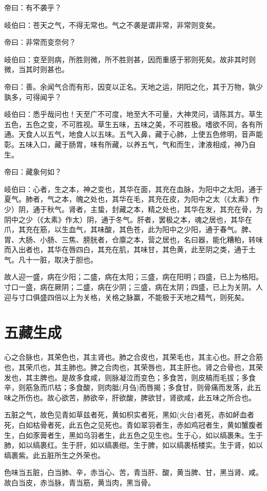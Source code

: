 \documentclass{article}%
\begin{document}
帝曰：有不袭乎？

岐伯曰：苍天之气，不得无常也。气之不袭是谓非常，非常则变矣。

帝曰：非常而变奈何？

岐伯曰：变至则病，所胜则微，所不胜则甚，因而重感于邪则死矣。故非其时则微，当其时则甚也。

帝曰：善。余闻气合而有形，因变以正名。天地之运，阴阳之化，其于万物，孰少孰多，可得闻乎？

岐伯曰：悉乎哉问也！天至广不可度，地至大不可量，大神灵问，请陈其方。草生五色，五色之变，不可胜视。草生五味，五味之美，不可胜极。嗜欲不同，各有所通。天食人以五气，地食人以五味。五气入鼻，藏于心肺，上使五色修明，音声能彰。五味入口，藏于肠胃，味有所藏，以养五气，气和而生，津液相成，神乃自生。

帝曰：藏象何如？

岐伯曰：心者，生之本，神之变也，其华在面，其充在血脉，为阳中之太阳，通于夏气。肺者，气之本，魄之处也，其华在毛，其充在皮，为阳中之太（《太素》作少）阴，通于秋气。肾者，主蛰，封藏之本，精之处也，其华在发，其充在骨，为阴中之少（《太素》作太）阴，通于冬气。肝者，罢极之本，魂之居也，其华在爪，其充在筋，以生血气，其味酸，其色苍，此为阳中之少阳，通于春气。脾、胃、大肠、小肠、三焦、膀胱者，仓廪之本，营之居也，名曰器，能化糟粕，转味而入出者也，其华在唇四白，其充在肌，其味甘，其色黄，此至阴之类，通于土气。凡十一脏，取决于胆也。

故人迎一盛，病在少阳；二盛，病在太阳；三盛，病在阳明；四盛，已上为格阳。寸口一盛，病在厥阴；二盛，病在少阴；三盛，病在太阴；四盛，已上为关阴。人迎与寸口俱盛四倍以上为关格，关格之脉赢，不能极于天地之精气，则死矣。
\section{五藏生成}
心之合脉也，其荣色也，其主肾也。肺之合皮也，其荣毛也，其主心也。肝之合筋也，其荣爪也，其主肺也。脾之合肉也，其荣唇也，其主肝也。肾之合骨也，其荣发也，其主脾也。是故多食咸，则脉凝泣而变色；多食苦，则皮槁而毛拔；多食辛，则筋急而爪枯；多食酸，则肉胝(月刍)而唇揭；多食甘，则骨痛而发落，此五味之所伤也。故心欲苦，肺欲辛，肝欲酸，脾欲甘，肾欲咸，此五味之所合也。

五脏之气，故色见青如草兹者死，黄如枳实者死，黑如(火台)者死，赤如衃血者死，白如枯骨者死，此五色之见死也。青如翠羽者生，赤如鸡冠者生，黄如蟹腹者生，白如豕膏者生，黑如乌羽者生，此五色之见生也。生于心，如以缟裹朱。生于肺，如以缟裹红。生于肝，如以缟裹绀。生于脾，如以缟裹栝楼实。生于肾，如以缟裹紫。此五脏所生之外荣也。

色味当五脏，白当肺、辛，赤当心、苦，青当肝、酸，黄当脾、甘，黑当肾、咸。故白当皮，赤当脉，青当筋，黄当肉，黑当骨。
\end{document}
